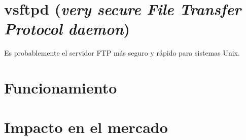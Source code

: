 \section*{vsftpd ({\em very secure File Transfer Protocol daemon})}

Es probablemente el servidor FTP m\'as seguro y r\'apido para sistemas Unix.


  
  
  
  
\section{Funcionamiento}
  
  
  
  
\section{Impacto en el mercado}
  
  
  
  
  
  
